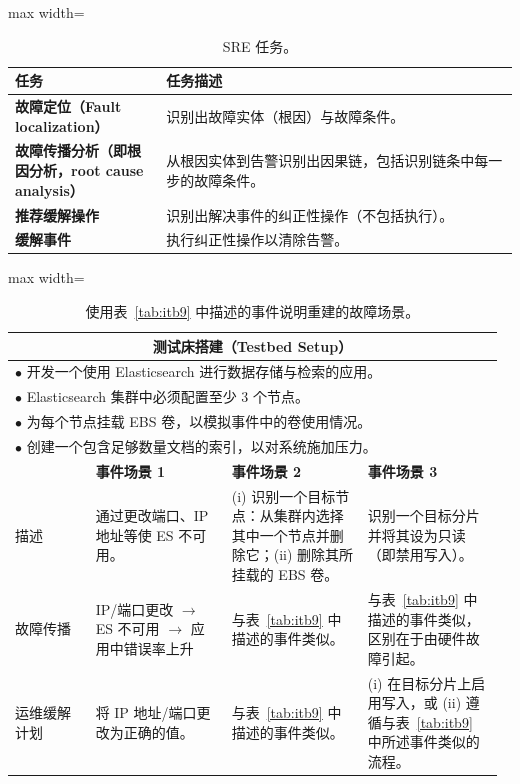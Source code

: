 \begin{table}[H]
\centering
\caption{SRE 任务。}
\label{tab:itb10}
\begin{adjustbox}{max width=\linewidth}
\begin{tabular}{@{}p{0.30\linewidth} p{0.70\linewidth}@{}}
\toprule
\textbf{任务} & \textbf{任务描述} \\
\midrule
\textbf{故障定位（Fault localization）} & 识别出故障实体（根因）与故障条件。 \\
\addlinespace
\textbf{故障传播分析（即根因分析，root cause analysis）} & 从根因实体到告警识别出因果链，包括识别链条中每一步的故障条件。 \\
\addlinespace
\textbf{推荐缓解操作} & 识别出解决事件的纠正性操作（不包括执行）。 \\
\addlinespace
\textbf{缓解事件} & 执行纠正性操作以清除告警。 \\
\bottomrule
\end{tabular}
\end{adjustbox}
\end{table}

\begin{table}[H]
\centering
\caption{使用表~\ref{tab:itb9} 中描述的事件说明重建的故障场景。}
\label{tab:itb11}
\begin{adjustbox}{max width=\linewidth}
\begin{tabular}{@{}p{0.16\linewidth} p{0.27\linewidth} p{0.27\linewidth} p{0.27\linewidth}@{}}
\multicolumn{4}{c}{\textbf{测试床搭建（Testbed Setup）}} \\
\midrule
\multicolumn{4}{p{\linewidth}}{$\bullet$ 开发一个使用 Elasticsearch 进行数据存储与检索的应用。} \\
\multicolumn{4}{p{\linewidth}}{$\bullet$ Elasticsearch 集群中必须配置至少 3 个节点。} \\
\multicolumn{4}{p{\linewidth}}{$\bullet$ 为每个节点挂载 EBS 卷，以模拟事件中的卷使用情况。} \\
\multicolumn{4}{p{\linewidth}}{$\bullet$ 创建一个包含足够数量文档的索引，以对系统施加压力。} \\
\midrule
 & \textbf{事件场景 1} & \textbf{事件场景 2} & \textbf{事件场景 3} \\
\midrule
描述 & 通过更改端口、IP 地址等使 ES 不可用。 & (i) 识别一个目标节点：从集群内选择其中一个节点并删除它；(ii) 删除其所挂载的 EBS 卷。 & 识别一个目标分片并将其设为只读（即禁用写入）。 \\
\addlinespace
故障传播 & IP/端口更改 $\rightarrow$ ES 不可用 $\rightarrow$ 应用中错误率上升 & 与表~\ref{tab:itb9} 中描述的事件类似。 & 与表~\ref{tab:itb9} 中描述的事件类似，区别在于由硬件故障引起。 \\
\addlinespace
运维缓解计划 & 将 IP 地址/端口更改为正确的值。 & 与表~\ref{tab:itb9} 中描述的事件类似。 & (i) 在目标分片上启用写入，或 (ii) 遵循与表~\ref{tab:itb9} 中所述事件类似的流程。 \\
\bottomrule
\end{tabular}
\end{adjustbox}
\end{table}

